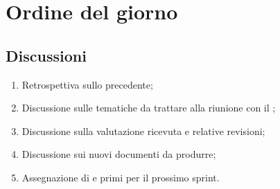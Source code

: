 \section{Ordine del giorno} \label{sec:agenda}
\subsection{Discussioni} \label{subsec:discussione}
\begin{enumerate}
    \item Retrospettiva sullo  precedente;
    \item Discussione sulle tematiche da trattare alla riunione con il ;
    \item Discussione sulla valutazione  ricevuta e relative revisioni;
    \item Discussione sui nuovi documenti da produrre;
    \item Assegnazione di  e primi  per il prossimo sprint.
\end{enumerate}
